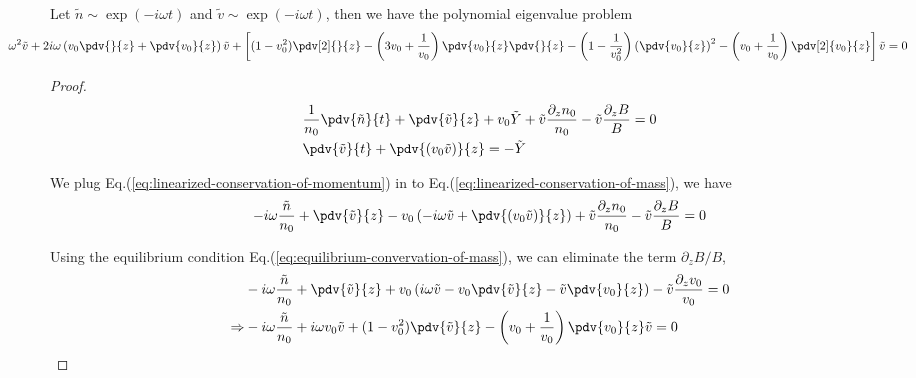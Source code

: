 \begin{proposition}
	Let $\tilde{n}\sim \exp(-i\omega t)$ and $\tilde{v} \sim \exp(-i\omega t)$, then we have the polynomial eigenvalue problem
	\begin{equation}
		\hspace{-0.5in}
		\omega^2 \tilde{v} 
		+ 2i\omega\left(v_0\pdv{}{z} + \pdv{v_0}{z}\right) \tilde{v} 
		+ \left[ (1-v_0^2)\pdv[2]{}{z} 
		-\left(3v_0 + \frac{1}{v_0}\right)\pdv{v_0}{z}\pdv{}{z} 
		- \left(1-\frac{1}{v_0^2}\right)\left(\pdv{v_0}{z}\right)^2 
		- \left(v_0+\frac{1}{v_0}\right)\pdv[2]{v_0}{z} \right]\tilde{v}
		= 0
		\label{eq:polynomial-eigenvalue-problem}
	\end{equation}
\end{proposition}
\begin{proof}
	\begin{align*}
		&\frac{1}{n_0}\pdv{\tilde{n}}{t} 
		+ \pdv{\tilde{v}}{z} + v_0\tilde{Y} + \tilde{v}\frac{\partial_z n_0}{n_0} - \tilde{v}\frac{\partial_z B}{B} = 0 
		\\
		&\pdv{\tilde{v}}{t} + \pdv{(v_0\tilde{v})}{z} = -\tilde{Y}
	\end{align*}
	
	
	We plug Eq.(\ref{eq:linearized-conservation-of-momentum}) in to Eq.(\ref{eq:linearized-conservation-of-mass}), we have 
	\[ -i\omega\frac{\tilde{n}}{n_0} 
	+ \pdv{\tilde{v}}{z} - v_0\left(-i\omega\tilde{v} + \pdv{(v_0\tilde{v})}{z}\right) + \tilde{v}\frac{\partial_z n_0}{n_0} - \tilde{v}\frac{\partial_z B}{B} = 0 \]
	
	Using the equilibrium condition Eq.(\ref{eq:equilibrium-convervation-of-mass}), we can eliminate the term $\partial_z B/B$,
	\begin{align*}
		&-i\omega\frac{\tilde{n}}{n_0} 
		+ \pdv{\tilde{v}}{z} 
		+ v_0\left(i\omega \tilde{v} - v_0\pdv{\tilde{v}}{z} - \tilde{v}\pdv{v_0}{z} \right)
		- \tilde{v}\frac{\partial_z v_0}{v_0} = 0\\
		\Rightarrow
		&-i\omega\frac{\tilde{n}}{n_0} 
		+ i\omega v_0\tilde{v}
		+ (1-v_0^2)\pdv{\tilde{v}}{z} 
		- \left(v_0+\frac{1}{v_0}\right)\pdv{v_0}{z}\tilde{v} = 0
	\end{align*}
	

\end{proof}
